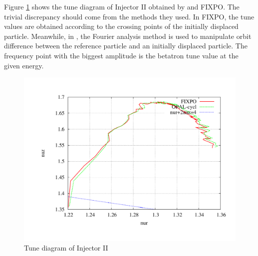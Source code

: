 Figure \ref{fig:tuning} shows the tune diagram of Injector II obtained by \opalcycl and FIXPO.
The trivial discrepancy should come from the methods they used.
In FIXPO, the tune values are obtained according to the crossing points of the initially displaced particle. Meanwhile, in \opalcycl, the Fourier 
analysis method is used to manipulate orbit difference between the reference particle and an initially displaced particle.
The frequency point with the biggest amplitude is the betatron tune value at the given energy.
\begin{figure}[ht]
  \begin{center} 
    \includegraphics[width=0.8\linewidth,angle=0]{figures/cyclotron/nurnuz}
    \caption{Tune diagram of Injector II}
    \label{fig:tuning}
  \end{center}
\end{figure}

